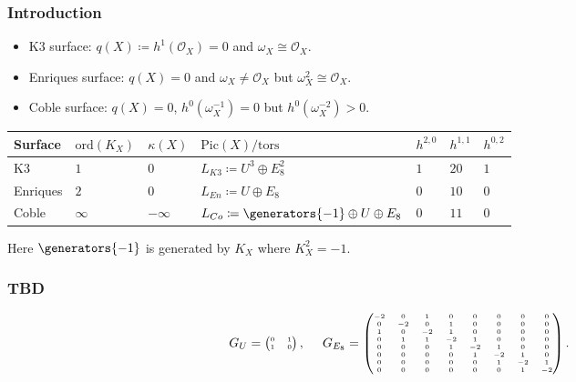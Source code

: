 \documentclass{beamer}
\begin{document}
{\begin{frame}
\frametitle{Introduction}
\begin{itemize}
\item K3 surface: \quad\hspace{0.6em} $q(X) \coloneqq h^1(\mathcal{O}_X) = 0$ and $\omega_X \cong \mathcal{O}_X$.
\item Enriques surface:  $q(X) = 0$ and $\omega_X \neq \mathcal{O}_X$ but $\omega_X^2 \cong \mathcal{O}_X$.
\item Coble surface: \hspace{1em} $q(X) = 0$, $h^0(\omega_X^{-1}) = 0$ but $h^0(\omega_X^{-2}) > 0$.
\end{itemize}
\vspace{1em}
\begin{centering}
{
\small
\begin{tabular}{l|llllll}
	Surface 	& $\mathrm{ord}(K_X)$ & $\kappa(X)$ 	& $\mathrm{Pic}(X)/\mathrm{tors}$ & $h^{2, 0}$ 
		& $h^{1,1}$ & $h^{0, 2}$ \\ \hline
	K3 			& $1$ & $0$ 			& $L_{K3} \coloneqq U^3 \oplus E_8^2$ 
		& $1$ & $20$ & $1$ \\
	Enriques 	& $2$ & $0$ 			& $L_{En} \coloneqq U \oplus E_8$ 
		& $0$ & $10$ & $0$ \\
	Coble 		& $\infty$ & $-\infty$ 		& $L_{Co} \coloneqq \generators{-1} \oplus U \oplus E_8$
		& $0$ & $11$ & $0$ \\
\end{tabular}
}
\end{centering}
\newline
{\small
\newline
Here $\generators{-1}$ is generated by $K_X$ where $K_X^2 = -1$.
}
\end{frame}
\begin{frame}\frametitle{TBD}
{
\[
\tiny 
G_U = \begin{pmatrix} 0 & 1 \\ 1 & 0 \end{pmatrix}, \qquad
G_{E_8}
=
\begin{pmatrix}
 -2 &  0 & 1 &  0 &  0 &  0 &  0 &  0 \\
 0 &  -2 &  0 & 1 &  0 &  0 &  0 &  0 \\
1 &  0 &  -2 & 1 &  0 &  0 &  0 &  0 \\
 0 & 1 & 1 &  -2 & 1 &  0 &  0 &  0 \\
 0 &  0 &  0 & 1 &  -2 & 1 &  0 &  0 \\
 0 &  0 &  0 &  0 & 1 &  -2 & 1 &  0 \\
 0 &  0 &  0 &  0 &  0 & 1 &  -2 & 1 \\
 0 &  0 &  0 &  0 &  0 &  0 & 1 &  -2
\end{pmatrix}.
\]
}


\end{frame}}
\end{document}
